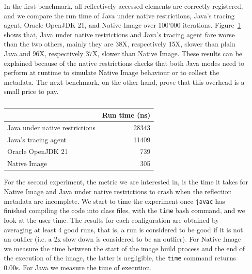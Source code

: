 In the first benchmark, all reflectively-accessed elements are correctly registered, and we compare the run time of Java under native restrictions, Java's tracing agent, Oracle OpenJDK 21, and Native Image over 100'000 iterations. Figure~\ref{tab:benchmark_1} shows that, Java under native restrictions and Java's tracing agent fare worse than the two others, mainly they are 38X, respectively 15X, slower than plain Java and 96X, respectively 37X, slower than Native Image. These results can be explained because of the native restrictions checks that both Java modes need to perform at runtime to simulate Native Image behaviour or to collect the metadata. The next benchmark, on the other hand, prove that this overhead is a small price to pay.

\begin{table}[ht]
\centering
\begin{tabular}{@{}lr@{}}
\toprule
                               & \multicolumn{1}{l}{Run time (ns)} \\ \midrule
Java under native restrictions & 28343                             \\
Java's tracing agent           & 11409                             \\
Oracle OpenJDK 21              & 739                               \\
Native Image                   & 305                               \\ \bottomrule
\end{tabular}
\caption{}
\label{tab:benchmark_1}
\end{table}

For the second experiment, the metric we are interested in, is the time it takes for Native Image and Java under native restrictions to crash when the reflection metadata are incomplete. 
We start to time the experiment once \verb|javac| has finished compiling the code into class files, with the \verb|time| bash command, and we look at the user time. 
The results for each configuration are obtained by averaging at least 4 good runs, that is, a run is considered to be good if it is not an outlier (i.e. a 2x slow down is considered to be an outlier).
For Native Image we measure the time between the start of the image build process and the end of the execution of the image, the latter is negligible, the \verb|time| command returns 0.00s. For Java we measure the time of execution.

